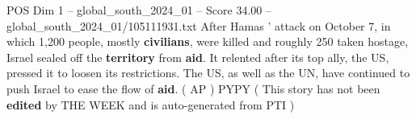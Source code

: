 \begin{textsample}{POS Dim 1 – global\_south\_2024\_01 – Score 34.00 – global\_south\_2024\_01/105111931.txt}
After Hamas ' attack on October 7, in which 1,200 people, mostly \textbf{civilians}, were killed and roughly 250 taken hostage, Israel sealed off the \textbf{territory} from \textbf{aid}.
It relented after its top ally, the US, pressed it to loosen its restrictions.
The US, as well as the UN, have continued to push Israel to ease the flow of \textbf{aid}. ( AP ) PYPY ( This story has not been \textbf{edited} by THE WEEK and is auto-generated from PTI )

\end{textsample}
